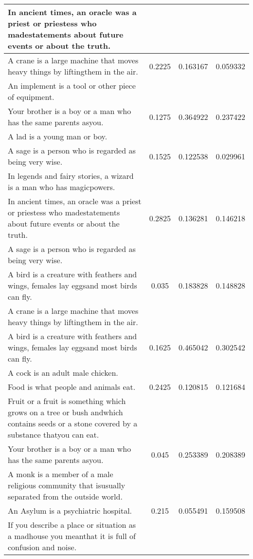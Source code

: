 \begin{table}[p]
\begin{center}
{\begin{tabular}{|p{9cm}|c|c|c|}
In ancient times, an oracle was a priest or priestess who madestatements about future events or about the truth. & & & \\
\hline
A crane is a large machine that moves heavy things by liftingthem in the air. & 0.2225 & 0.163167 & 0.059332 \\
An implement is a tool or other piece of equipment. & & & \\
\hline
Your brother is a boy or a man who has the same parents asyou. & 0.1275 & 0.364922 & 0.237422 \\
A lad is a young man or boy. & & & \\
\hline
A sage is a person who is regarded as being very wise. & 0.1525 & 0.122538 & 0.029961 \\
In legends and fairy stories, a wizard is a man who has magicpowers. & & & \\
\hline
In ancient times, an oracle was a priest or priestess who madestatements about future events or about the truth. & 0.2825 & 0.136281 & 0.146218 \\
A sage is a person who is regarded as being very wise. & & & \\
\hline
A bird is a creature with feathers and wings, females lay eggsand most birds can fly. & 0.035 & 0.183828 & 0.148828 \\
A crane is a large machine that moves heavy things by liftingthem in the air. & & & \\
\hline
A bird is a creature with feathers and wings, females lay eggsand most birds can fly. & 0.1625 & 0.465042 & 0.302542 \\
A cock is an adult male chicken. & & & \\
\hline
Food is what people and animals eat. & 0.2425 & 0.120815 & 0.121684 \\
Fruit or a fruit is something which grows on a tree or bush andwhich contains seeds or a stone covered by a substance thatyou can eat. & & & \\
\hline
Your brother is a boy or a man who has the same parents asyou. & 0.045 & 0.253389 & 0.208389 \\
A monk is a member of a male religious community that isusually separated from the outside world. & & & \\
\hline
An Asylum is a psychiatric hospital. & 0.215 & 0.055491 & 0.159508 \\
If you describe a place or situation as a madhouse you meanthat it is full of confusion and noise. & & & \\
\hline

\end{tabular}}
\end{center}
\end{table}
